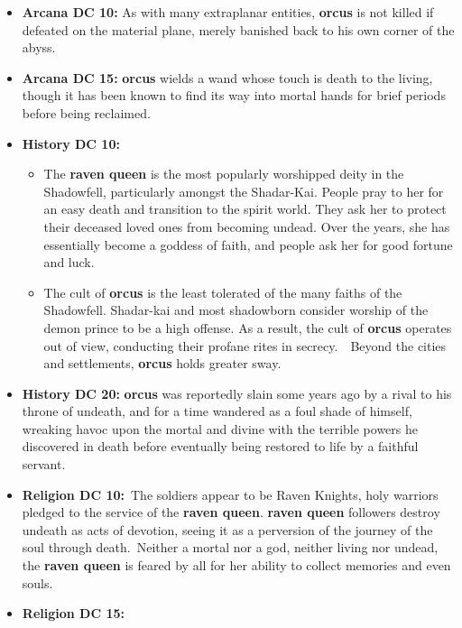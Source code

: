 \documentclass[10pt,twocolumn]{article}
\renewcommand{\textsc}[1]{\XCharterSC#1}
\let\oldtextbf\textbf
\renewcommand{\textbf}[1]{\oldtextbf{{#1}}}
\providecommand{\tightlist}{
  \setlength{\itemsep}{4pt}
  \setlength{\topsep}{0pt}
  \setlength{\parsep}{0pt}
  \setlength{\parskip}{0pt}
  \setlength{\partopsep}{0pt}
}
\begin{document}
\begin{itemize}
\tightlist
\item
  \textbf{Arcana DC 10:} As with many extraplanar entities,
  \textcolor{keywordcolor}{\textbf{\textsc{orcus}}} is not killed if
  defeated on the material plane, merely banished back to his own corner
  of the abyss.
\item
  \textbf{Arcana DC 15:}
  \textcolor{keywordcolor}{\textbf{\textsc{orcus}}} wields a wand whose
  touch is death to the living, though it has been known to find its way
  into mortal hands for brief periods before being reclaimed.
\item
  \textbf{History DC 10:}~

  \begin{itemize}
  \tightlist
  \item
    The \textcolor{keywordcolor}{\textbf{\textsc{raven queen}}} is the
    most popularly worshipped deity in the Shadowfell, particularly
    amongst the Shadar-Kai. People pray to her for an easy death and
    transition to the spirit world. They ask her to protect their
    deceased loved ones from becoming undead. Over the years, she has
    essentially become a goddess of faith, and people ask her for good
    fortune and luck.
  \item
    The cult of \textcolor{keywordcolor}{\textbf{\textsc{orcus}}} is the
    least tolerated of the many faiths of the Shadowfell. Shadar-kai and
    most shadowborn consider worship of the demon prince to be a high
    offense. As a result, the cult of
    \textcolor{keywordcolor}{\textbf{\textsc{orcus}}} operates out of
    view, conducting their profane rites in secrecy.~~Beyond the cities
    and settlements, \textcolor{keywordcolor}{\textbf{\textsc{orcus}}}
    holds greater sway.
  \end{itemize}
\item
  \textbf{History DC 20:}
  \textcolor{keywordcolor}{\textbf{\textsc{orcus}}} was reportedly slain
  some years ago by a rival to his throne of undeath, and for a time
  wandered as a foul shade of himself, wreaking havoc upon the mortal
  and divine with the terrible powers he discovered in death before
  eventually being restored to life by a faithful servant.
\item
  \textbf{Religion DC 10:}~The soldiers appear to be Raven Knights, holy
  warriors pledged to the service of the
  \textcolor{keywordcolor}{\textbf{\textsc{raven queen}}}.
  \textcolor{keywordcolor}{\textbf{\textsc{raven queen}}} followers
  destroy undeath as acts of devotion, seeing it as a perversion of the
  journey of the soul through death.~Neither a mortal nor a god, neither
  living nor undead, the
  \textcolor{keywordcolor}{\textbf{\textsc{raven queen}}} is feared by
  all for her ability to collect memories and even souls.
\item
  \textbf{Religion DC 15:}~


\end{itemize}
\end{document}

